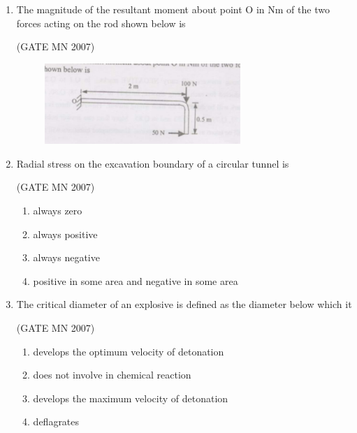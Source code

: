 \documentclass[journal]{IEEEtran}
\begin{document}
\begin{enumerate}
    \item The magnitude of the resultant moment about point O in Nm of the two forces acting on the rod shown below is
	 
	    \hfill (GATE MN 2007)
    \begin{figure}[H]
    \centering
        \includegraphics[width=0.7\textwidth]{Screenshot_2025_0812_111906.png}
	    \caption{}
    \label{fig:Q4}
    \end{figure}
    \begin{enumerate}
	\begin{multicols}{4}	    
        \item 25 
        \item 125 
        \item 175 
        \item 225 
	\end{multicols}	
    \end{enumerate}


    \item Radial stress on the excavation boundary of a circular tunnel is
	 
	    \hfill (GATE MN 2007)
    \begin{enumerate}
		    
        \item always zero
        \item always positive
        \item always negative
        \item positive in some area and negative in some area
		
    \end{enumerate}


    \item The critical diameter of an explosive is defined as the diameter below which it
	  

	    \hfill (GATE MN 2007)
    \begin{enumerate}
        \item develops the optimum velocity of detonation
        \item does not involve in chemical reaction
        \item develops the maximum velocity of detonation
        \item deflagrates
		

\end{enumerate}
\end{enumerate}
\end{document}
